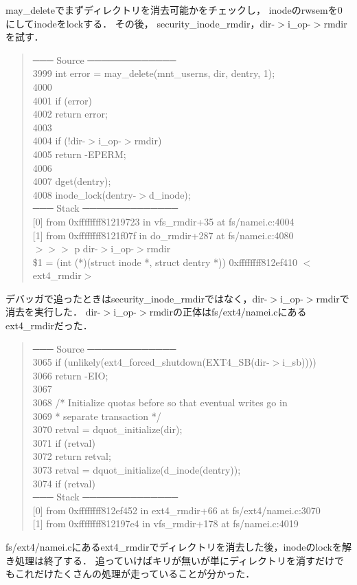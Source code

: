 may\_deleteでまずディレクトリを消去可能かをチェックし，
inodeのrwsemを0にしてinodeをlockする．
その後， security\_inode\_rmdir，dir-$>$i\_op-$>$rmdirを試す．
\begin{quote}
─── Source ─────────────
\\
 3999      int error = may\_delete(mnt\_userns, dir, dentry, 1); \\
 4000 \\
 4001      if (error) \\
 4002          return error; \\
 4003 \\
 4004      if (!dir-$>$i\_op-$>$rmdir) \\
 4005          return -EPERM; \\
 4006 \\
 4007      dget(dentry); \\
 4008      inode\_lock(dentry-$>$d\_inode); \\
─── Stack ──────────────
\\
{[0]} from 0xffffffff81219723 in vfs\_rmdir+35 at fs/namei.c:4004 \\
{[1]} from 0xffffffff8121f07f in do\_rmdir+287 at fs/namei.c:4080 \\
$>>>$ p dir-$>$i\_op-$>$rmdir \\
\$1 = (int (*)(struct inode *, struct dentry *)) 0xffffffff812ef410 $<$ext4\_rmdir$>$
\end{quote}
デバッガで追ったときはsecurity\_inode\_rmdirではなく，dir-$>$i\_op-$>$rmdirで消去を実行した．
dir-$>$i\_op-$>$rmdirの正体はfs/ext4/namei.cにあるext4\_rmdirだった．
\begin{quote}
─── Source ─────────────
\\
 3065      if (unlikely(ext4\_forced\_shutdown(EXT4\_SB(dir-$>$i\_sb)))) \\
 3066          return -EIO; \\
 3067 \\
 3068      /* Initialize quotas before so that eventual writes go in \\
 3069       * separate transaction */ \\
 3070      retval = dquot\_initialize(dir); \\
 3071      if (retval) \\
 3072          return retval; \\
 3073      retval = dquot\_initialize(d\_inode(dentry)); \\
 3074      if (retval) \\
─── Stack ──────────────
\\
{[0]} from 0xffffffff812ef452 in ext4\_rmdir+66 at fs/ext4/namei.c:3070 \\
{[1]} from 0xffffffff812197e4 in vfs\_rmdir+178 at fs/namei.c:4019
\end{quote}

fs/ext4/namei.cにあるext4\_rmdirでディレクトリを消去した後，inodeのlockを解き処理は終了する．
追っていけばキリが無いが単にディレクトリを消すだけでもこれだけたくさんの処理が走っていることが分かった．

